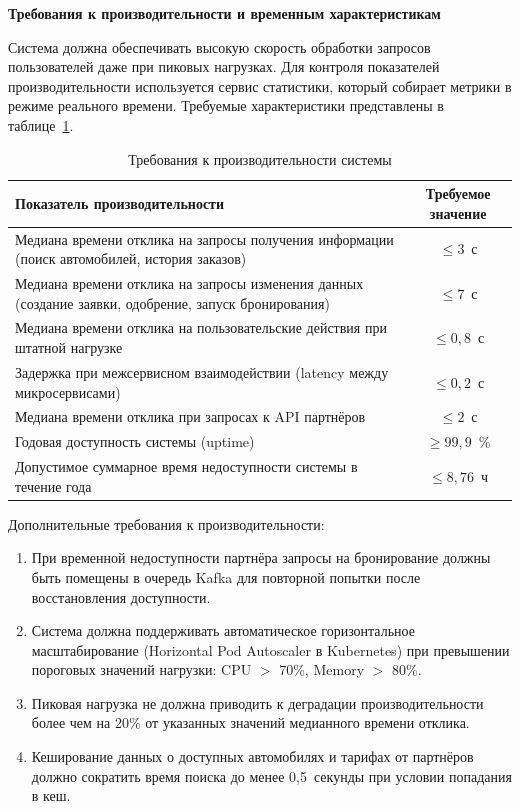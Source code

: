 \documentclass{bmstu}
\begin{document}
\begin{center}
    \textbf{Требования к производительности и временным характеристикам}
\end{center}

Система должна обеспечивать высокую скорость обработки запросов пользователей даже при пиковых нагрузках. Для контроля показателей производительности используется сервис статистики, который собирает метрики в режиме реального времени. Требуемые характеристики представлены в таблице~\ref{tab:performance}.

\begin{table}[h]
\centering
\caption{Требования к производительности системы}
\label{tab:performance}
\begin{tabularx}{\textwidth}{|X|c|}
\hline
\textbf{Показатель производительности} & \textbf{Требуемое значение} \\
\hline
Медиана времени отклика на запросы получения информации (поиск автомобилей, история заказов) & $\leq 3$~с \\
\hline
Медиана времени отклика на запросы изменения данных (создание заявки, одобрение, запуск бронирования) & $\leq 7$~с \\
\hline
Медиана времени отклика на пользовательские действия при штатной нагрузке & $\leq 0{,}8$~с \\
\hline
Задержка при межсервисном взаимодействии (latency между микросервисами) & $\leq 0{,}2$~с \\
\hline
Медиана времени отклика при запросах к API партнёров & $\leq 2$~с \\
\hline
Годовая доступность системы (uptime) & $\geq 99{,}9$~\% \\
\hline
Допустимое суммарное время недоступности системы в течение года & $\leq 8{,}76$~ч \\
\hline
\end{tabularx}
\end{table}

Дополнительные требования к производительности:

\begin{enumerate}
    \item При временной недоступности партнёра запросы на бронирование должны быть помещены в очередь Kafka для повторной попытки после восстановления доступности.
    
    \item Система должна поддерживать автоматическое горизонтальное масштабирование (Horizontal Pod Autoscaler в Kubernetes) при превышении пороговых значений нагрузки: CPU $>$ 70\%, Memory $>$ 80\%.
    
    \item Пиковая нагрузка не должна приводить к деградации производительности более чем на 20\% от указанных значений медианного времени отклика.
    
    \item Кеширование данных о доступных автомобилях и тарифах от партнёров должно сократить время поиска до менее 0,5~секунды при условии попадания в кеш.
\end{enumerate}
\end{document}
